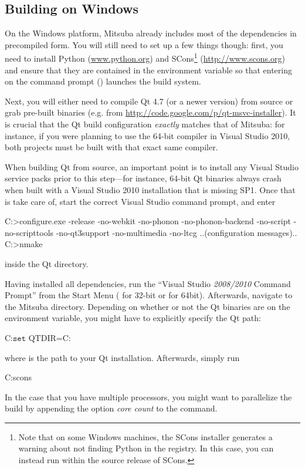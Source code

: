 \subsection{Building on Windows}
On the Windows platform, Mitsuba already includes most of the dependencies in precompiled form.
You will still need to set up a few things though: first, you need to install Python 
(\url{www.python.org}) and SCons\footnote{Note that on some Windows machines, the SCons 
installer generates a warning about not finding Python in the registry. In this case, you can instead run  within the source release of SCons.} (\url{http://www.scons.org}) and ensure that they are contained in the  environment variable so that entering  on the command prompt () launches the build system.

Next, you will either need to compile Qt 4.7 (or a newer version) from 
source or grab pre-built binaries (e.g. from 
\url{http://code.google.com/p/qt-msvc-installer}). 
It is crucial that the Qt build configuration \emph{exactly} matches that of Mitsuba: 
for instance, if you were planning to use the 64-bit compiler in Visual 
Studio 2010, both projects must be built with that exact same compiler.

When building Qt from source, an important point is to install any 
Visual Studio service packs prior to this step---for instance, 64-bit
Qt binaries always crash when built with a Visual Studio 2010 installation
that is missing SP1. Once that is take care of, start the correct Visual Studio command 
prompt, and enter
\begin{shell}
C:\Qt>configure.exe -release -no-webkit -no-phonon -no-phonon-backend -no-script
      -no-scripttools -no-qt3support -no-multimedia -no-ltcg
..(configuration messages)..
C:\Qt>nmake
\end{shell}
inside the Qt directory.

Having installed all dependencies, run the ``Visual Studio \emph{2008/2010} Command 
Prompt'' from the Start Menu ( for 32-bit or  for 64bit). Afterwards,
navigate to the Mitsuba directory.
Depending on whether or not the Qt binaries are on the 
environment variable, you might have to explicitly specify the Qt path:
\begin{shell}
C:\Mitsuba\>$\texttt{set}$ QTDIR=C:\Qt
\end{shell}
where  is the path to your Qt installation.
Afterwards, simply run
\begin{shell}
C:\Mitsuba\>scons
\end{shell}
In the case that you have multiple processors, you might want to parallelize the build by appending the option \emph{core count} to the  command.

